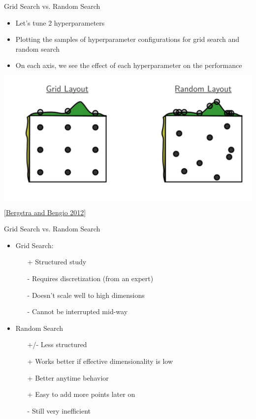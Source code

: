\documentclass[aspectratio=169]{../latex_main/tntbeamer}  %
\begin{document}
\begin{frame}[c]{Grid Search vs. Random Search}

\vspace{-1em}
\begin{itemize}
    \item Let's tune 2 hyperparameters 
    \item Plotting the samples of hyperparameter configurations for grid search and random search
    \item On each axis, we see the effect of each hyperparameter on the performance
\end{itemize}

\centering
\includegraphics[width=.72\textwidth]{figure/grid_random.jpg}

\footnotesize
[\href{https://www.jmlr.org/papers/volume13/bergstra12a/bergstra12a.pdf}{Bergstra and Bengio 2012}]


\end{frame}
\begin{frame}[c]{Grid Search vs. Random Search}
	
\begin{itemize}
    \item Grid Search:
    \begin{itemize}
        \item[+] Structured study
        \item[-] Requires discretization (from an expert)
        \item[-] Doesn't scale well to high dimensions
        \item[-] Cannot be interrupted mid-way
    \end{itemize}
    \item Random Search
    \begin{itemize}
        \item[+/-] Less structured
        \item[+] Works better if effective dimensionality is low 
        \item[+] Better anytime behavior
        \item[+] Easy to add more points later on
        \item[-] Still very inefficient
    \end{itemize}
\end{itemize}
\end{frame}
\end{document}
